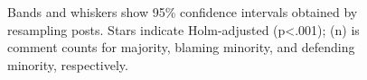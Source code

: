 \begin{figure}[t]
\begin{minipage}[t]{0.42\textwidth}
{  Bands and whiskers show 95\% confidence intervals obtained by resampling posts. Stars indicate Holm-adjusted (p<.001); (n) is comment counts for majority, blaming minority, and defending minority, respectively.}
  \label{fig:aita-certainty-progress}

  \end{minipage}

\end{figure}